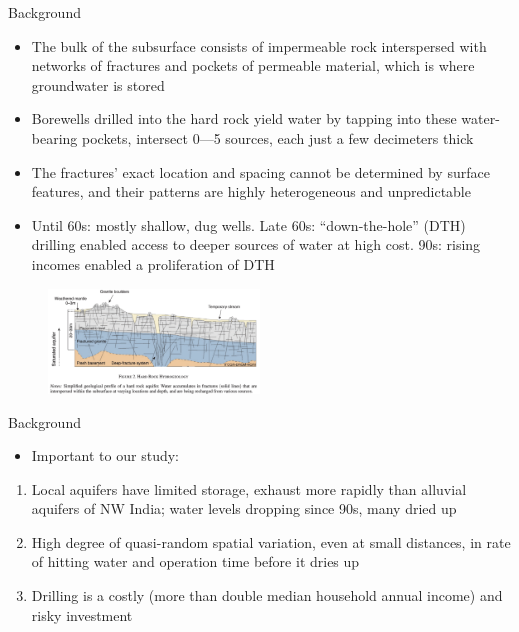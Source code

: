 \documentclass[10pt]{beamer}
\begin{document}
\begin{frame}
	{Background}
	\begin{itemize}
		\item The bulk of the subsurface consists of impermeable rock interspersed with networks of fractures and pockets of permeable material, which is where groundwater is stored
		\item Borewells drilled into the hard rock yield water by tapping into these water-bearing pockets, intersect 0—5 sources, each just a few decimeters thick
		\item The fractures' exact location and spacing cannot be determined by surface features, and their patterns are highly heterogeneous and unpredictable
		\item Until 60s: mostly shallow, dug wells. Late 60s: “down-the-hole” (DTH) drilling enabled access to deeper sources of water at high cost. 90s: rising incomes enabled a proliferation of DTH
	\end{itemize}
	\begin{figure}
		\centering
		\includegraphics[width=0.5\textwidth]{figure2.png}
		\caption{}
	\end{figure}
\end{frame}

\begin{frame}
	{Background}
	\begin{itemize}
		\item Important to our study:

	\end{itemize}
	\begin{enumerate}
		\item Local aquifers have limited storage, exhaust more rapidly than alluvial aquifers of NW India; water levels dropping since 90s, many dried up
		\item High degree of quasi-random spatial variation, even at small distances, in rate of hitting water and operation time before it dries up
		\item Drilling is a costly (more than double median household annual income) and risky investment
	\end{enumerate}
\end{frame}
\end{document}
